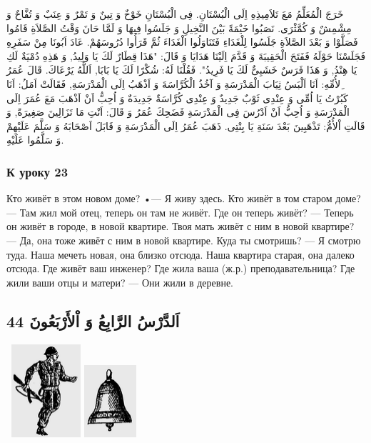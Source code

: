 \documentclass[a5paper]{article}
\begin{document}
خَرَجَ الْمُعَلِّمُ مَعَ تَلاَمِيذِهِ اِلَى الْبُسْتَانِ. فِى الْبُسْتَانِ خَوْخٌ وَ تِينٌ وَ تَمْرٌ وَ عِنَبٌ وَ تُفَّاحٌ وَ مِشْمِشٌ وَ كُمَّثْرَى. نَصَبُوا خَيْمَةً بَيْنَ النَّخِيلِ وَ جَلَسُوا فِيهَا وَ لَمَّا حَانَ وَقْتُ الصَّلاَةِ قَامُوا فَصَلَّوْا وَ بَعْدَ الصَّلاَةِ جَلَسُوا لِلْغَدَاءِ فَتَنَاوَلُوا الْغَدَاءَ ثُمَّ قَرَأُوا دُرُوسَهُمْ. عَادَ اَبُونَا مِنْ سَفَرِهِ فَجَلَسْنَا حَوْلَهُ فَفَتَحَ الْحَقِيبَةَ وَ قَدَّمَ اِلَيْنَا هَدَايَا وَ قَالَ: "هَذَا قِطَارٌ لَكَ يَا وَلِيدُ, وَ هَذِهِ دُمْيَةٌ لَكِ يَا هِنْدُ, وَ هَذَا فَرَسٌ خَشَبِىٌّ لَكَ يَا فَرِيدُ". فَقُلْنَا لَهُ: شُكْرًا لَكَ يَا بَابَا, اَللَّهُ يَرْعَاكَ. قَالَ عُمَرُ ِلأُمِّهِ: اَنَا اَلْبَسُ ثِيَابَ الْمَدْرَسَةِ وَ آخُذُ الْكُرَّاسَةَ وَ اَذْهَبُ اِلَى الْمَدْرَسَةِ, فَقَالَتْ اَمَلُ: اَنَا كَبُرْتُ يَا اُمِّى وَ عِنْدِى ثَوْبٌ جَدِيدٌ وَ عِنْدِى كُرَّاسَةٌ جَدِيدَةٌ وَ اُحِبُّ اَنْ اَذْهَبَ مَعَ عُمَرَ اِلَى الْمَدْرَسَةِ وَ اُحِبُّ اَنْ اَدْرُسَ فِى الْمَدْرَسَةِ فَضَحِكَ عُمَرُ وَ قَالَ: اَنْتِ مَا تَزَالِينَ صَغِيرَةً, وَ قَالَتِ اْلأُمُّ: تَذْهَبِينَ بَعْدَ سَنَةِ يَا بِنْتِى. ذَهَبَ عُمَرُ اِلَى الْمَدْرَسَةِ وَ قَابَلَ اَصْحَابَهُ وَ سَلَّمَ عَلَيْهِمْ وَ سَلَّمُوا عَلَيْهِ. 

\subsubsection{К уроку 23}
Кто живёт в этом новом доме? •— Я живу здесь. Кто живёт в том старом доме? — Там жил мой отец, теперь он там не живёт. Где он теперь живёт? — Теперь он живёт в городе, в новой квартире. Твоя мать живёт с ним в новой квартире? — Да, она тоже живёт с ним в новой квартире. Куда ты смотришь? — Я смотрю туда. Наша мечеть новая, она близко отсюда. Наша квартира старая, она далеко отсюда. Где живёт ваш инженер? Где жила ваша (ж.р.) преподавательница? Где жили ваши отцы и матери? — Они жили в деревне.

\subsection{اَلدَّرْسُ الرَّابِعُ وَ اْلأَرْبَعُونَ 44}
\  \includegraphics[width=1.0102in,height=1.3646in]{images/MuhammadBagauddinprettified-img140.png}   \includegraphics[width=0.7602in,height=1.0626in]{images/MuhammadBagauddinprettified-img141.png} 
\end{document}
